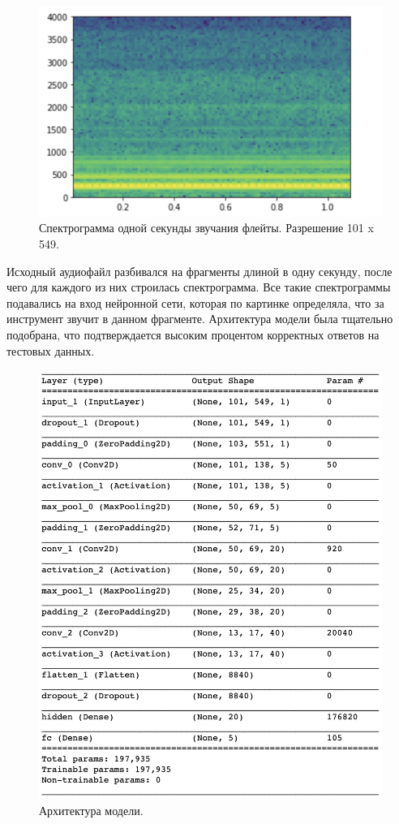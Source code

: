 \documentclass[14pt,a4paper]{article}
\begin{document}
\begin{figure}[H]
\centering
\includegraphics[scale=0.3]{img/spectrogram.png}
\caption{Спектрограмма одной секунды звучания флейты. Разрешение 101 x 549.}
\end{figure}

Исходный аудиофайл разбивался на фрагменты длиной в одну секунду, после чего для каждого из них строилась спектрограмма. Все такие спектрограммы подавались на вход нейронной сети, которая по картинке определяла, что за инструмент звучит в данном фрагменте. Архитектура модели была тщательно подобрана, что подтверждается высоким процентом корректных ответов на тестовых данных.

\begin{figure}[H]
\centering
\includegraphics[scale=0.5]{img/model.png}
\caption{Архитектура модели.}
\end{figure}
\end{document}
